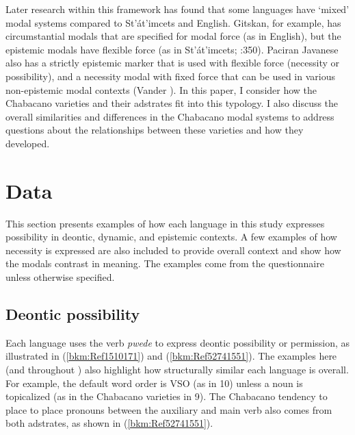 Later research within this framework has found that some languages have ‘mixed’ modal systems compared to St’át’imcets and English. Gitskan, for example, has circumstantial modals that are specified for modal force (as in English), but the epistemic modals have flexible force (as in St’át’imcets; \citealt{Matthewson2013}:350). Paciran Javanese also has a strictly epistemic marker that is used with flexible force (necessity or possibility), and a necessity modal with fixed force that can be used in various non-epistemic modal contexts (Vander \citealt{Klok2013}). In this paper, I consider how the Chabacano varieties and their adstrates fit into this typology. I also discuss the overall similarities and differences in the Chabacano modal systems to address questions about the relationships between these varieties and how they developed.

\section{Data}

This section presents examples of how each language in this study expresses possibility in deontic, dynamic, and epistemic contexts. A few examples of how necessity is expressed are also included to provide overall context and show how the modals contrast in meaning. The examples come from the questionnaire unless otherwise specified.

\subsection{Deontic possibility}

Each language uses the verb \textit{pwede} to express deontic possibility or permission, as illustrated in (\ref{bkm:Ref1510171}) and (\ref{bkm:Ref52741551}). The examples here (and throughout ) also highlight how structurally similar each language is overall. For example, the default word order is VSO (as in 10) unless a noun is topicalized (as in the Chabacano varieties in 9). The Chabacano tendency to place to place pronouns between the auxiliary and main verb also comes from both adstrates, as shown in (\ref{bkm:Ref52741551}).  

